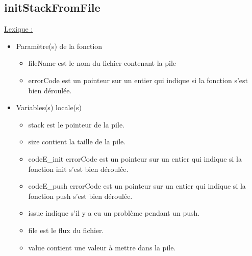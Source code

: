 \documentclass[a4paper]{article}
\begin{document}
\subsection{initStackFromFile}
\underline{Lexique :}

\begin{itemize}

\item Paramètre(s) de la fonction  

\begin{itemize}

\item fileName est le nom du fichier contenant la pile
\item errorCode est un pointeur sur un entier qui indique si la fonction s'est bien déroulée.

\end{itemize}
\item Variables(s) locale(s)

\begin{itemize}

\item stack est le pointeur de la pile.
\item size contient la taille de la pile.
\item codeE\_init errorCode est un pointeur sur un entier qui indique si la fonction init s'est bien déroulée.
\item codeE\_push errorCode est un pointeur sur un entier qui indique si la fonction push s'est bien déroulée.
\item issue indique s'il y a eu un problème pendant un push.
\item file est le flux du fichier.
\item value contient une valeur à mettre dans la pile.

\end{itemize}
\end{itemize}
\end{document}
